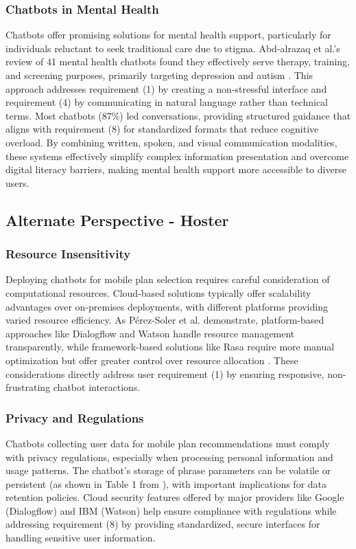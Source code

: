 \documentclass[conference]{IEEEtran}
\begin{document}
\subsubsection{Chatbots in Mental Health}
Chatbots offer promising solutions for mental health support, particularly for individuals reluctant to seek traditional care due to stigma. Abd-alrazaq et al.'s review of 41 mental health chatbots found they effectively serve therapy, training, and screening purposes, primarily targeting depression and autism \cite{b10}. This approach addresses requirement (1) by creating a non-stressful interface and requirement (4) by communicating in natural language rather than technical terms. Most chatbots (87\%) led conversations, providing structured guidance that aligns with requirement (8) for standardized formats that reduce cognitive overload. By combining written, spoken, and visual communication modalities, these systems effectively simplify complex information presentation and overcome digital literacy barriers, making mental health support more accessible to diverse users.
\subsection{Alternate Perspective - Hoster}
\subsubsection{Resource Insensitivity}
Deploying chatbots for mobile plan selection requires careful consideration of computational resources. Cloud-based solutions typically offer scalability advantages over on-premises deployments, with different platforms providing varied resource efficiency. As Pérez-Soler et al. demonstrate, platform-based approaches like Dialogflow and Watson handle resource management transparently, while framework-based solutions like Rasa require more manual optimization but offer greater control over resource allocation \cite{b11}. These considerations directly address user requirement (1) by ensuring responsive, non-frustrating chatbot interactions.
\subsubsection{Privacy and Regulations}
Chatbots collecting user data for mobile plan recommendations must comply with privacy regulations, especially when processing personal information and usage patterns. The chatbot's storage of phrase parameters can be volatile or persistent (as shown in Table 1 from \cite{b11}), with important implications for data retention policies. Cloud security features offered by major providers like Google (Dialogflow) and IBM (Watson) help ensure compliance with regulations while addressing requirement (8) by providing standardized, secure interfaces for handling sensitive user information.
\end{document}
